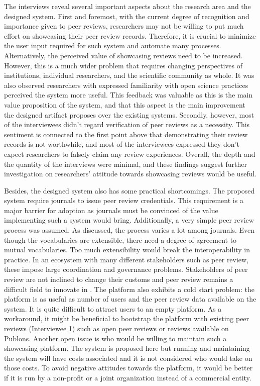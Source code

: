 The interviews reveal several important aspects about the research area and the designed system. First and foremost, with the current degree of recognition and importance given to peer reviews, researchers may not be willing to put much effort on showcasing their peer review records. Therefore, it is crucial to minimize the user input required for such system and automate many processes. Alternatively, the perceived value of showcasing reviews need to be increased. However, this is a much wider problem that requires changing perspectives of institutions, individual researchers, and the scientific community as whole. It was also observed researchers with expressed familiarity with open science practices perceived the system more useful. This feedback was valuable as this is the main value proposition of the system, and that this aspect is the main improvement the designed artifact proposes over the existing systems. Secondly, however, most of the interviewees didn't regard verification of peer reviews as a necessity. This sentiment is connected to the first point above that demonstrating their review records is not worthwhile, and most of the interviewees expressed they don't expect researchers to falsely claim any review experiences. Overall, the depth and the quantity of the interviews were minimal, and these findings suggest further investigation on researchers' attitude towards showcasing reviews would be useful.

Besides, the designed system also has some practical shortcomings. The proposed system require journals to issue peer review credentials. This requirement is a major barrier for adoption as journals must be convinced of the value implementing such a system would bring. Additionally, a very simple peer review process was assumed. As discussed, the process varies a lot among journals. Even though the vocabularies are extensible, there need a degree of agreement to mutual vocabularies. Too much extensibility would break the interoperability in practice. In an ecosystem with many different stakeholders such as peer review, these impose large coordination and governance problems. Stakeholders of peer review are not inclined to change their customs and peer review remains a difficult field to innovate in \parencite[3]{Tennant.2018b}. The platform also exhibits a cold start problem: the platform is as useful as number of users and the peer review data available on the system. It is quite difficult to attract users to an empty platform. As a workaround, it might be beneficial to bootstrap the platform with existing peer reviews (Interviewee 1) such as open peer reviews or reviews available on Publons. Another open issue is who would be willing to maintain such a showcasing platform. The system is proposed here but running and maintaining the system will have costs associated and it is not considered who would take on those costs. To avoid negative attitudes towards the platform, it would be better if it is run by a non-profit or a joint organization instead of a commercial entity. 
 
